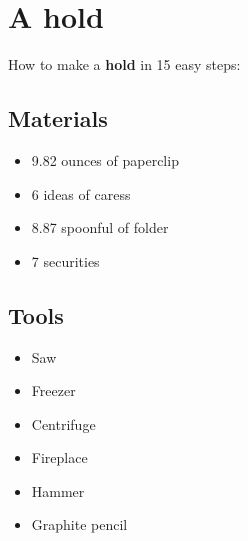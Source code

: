 \documentclass{article}
\begin{document}
\section{A hold}How to make a \textbf{hold} in 15 easy steps:

\subsection{Materials}\begin{itemize}
\item 
9.82 ounces of paperclip
\item 
6 ideas of caress
\item 
8.87 spoonful of folder
\item 
7 securities
\end{itemize}
\subsection{Tools}\begin{itemize}
\item 
Saw
\item 
Freezer
\item 
Centrifuge
\item 
Fireplace
\item 
Hammer
\item 
Graphite pencil
\end{itemize}
\end{document}
